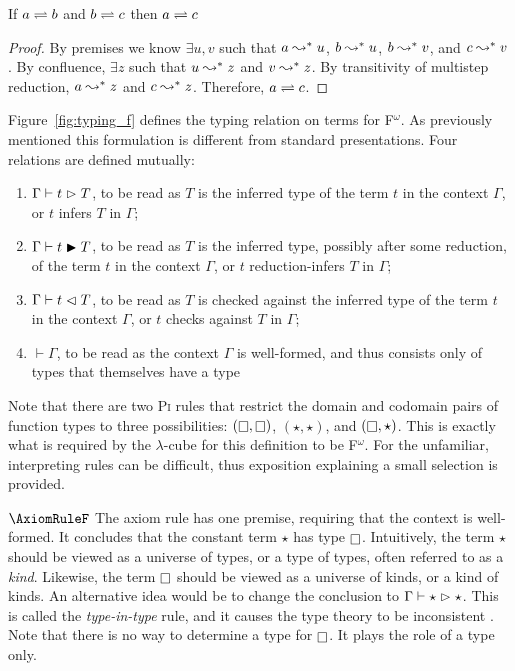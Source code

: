 \begin{theorem}
    \label{thm:1:trans}
    If $a \rightleftharpoons b$ and $b \rightleftharpoons c$ then $a \rightleftharpoons c$
\end{theorem}
\begin{proof}
    By premises we know $\exists u, v$ such that $a \leadsto^* u$, $b \leadsto^* u$, $b \leadsto^* v$, and $c \leadsto^* v$.
    By confluence, $\exists z$ such that $u \leadsto^* z$ and $v \leadsto^* z$.
    By transitivity of multistep reduction, $a \leadsto^* z$ and $c \leadsto^* z$.
    Therefore, $a \rightleftharpoons c$.
\end{proof}



Figure~\ref{fig:typing_f} defines the typing relation on terms for F$^\omega$.
As previously mentioned this formulation is different from standard presentations.
Four relations are defined mutually:
\begin{enumerate}
    \item $\Gamma \vdash t \vartriangleright T$, to be read as $T$ is the inferred type of the term $t$ in the context $\Gamma$, or $t$ infers $T$ in $\Gamma$;
    \item $\Gamma \vdash t \blacktriangleright T$, to be read as $T$ is the inferred type, possibly after some reduction, of the term $t$ in the context $\Gamma$, or $t$ reduction-infers $T$ in $\Gamma$;
    \item $\Gamma \vdash t \vartriangleleft T$, to be read as $T$ is checked against the inferred type of the term $t$ in the context $\Gamma$, or $t$ checks against $T$ in $\Gamma$;
    \item $\vdash \Gamma$, to be read as the context $\Gamma$ is well-formed, and thus consists only of types that themselves have a type
\end{enumerate}
Note that there are two \textsc{Pi} rules that restrict the domain and codomain pairs of function types to three possibilities: $(\kind, \kind)$, $(\star, \star)$, and $(\kind, \star)$.
This is exactly what is required by the $\lambda$-cube for this definition to be F$^\omega$.
For the unfamiliar, interpreting rules can be difficult, thus exposition explaining a small selection is provided.

$\AxiomRuleF$ The axiom rule has one premise, requiring that the context is well-formed.
It concludes that the constant term $\star$ has type $\kind$.
Intuitively, the term $\star$ should be viewed as a universe of types, or a type of types, often referred to as a \textit{kind}.
Likewise, the term $\kind$ should be viewed as a universe of kinds, or a kind of kinds.
An alternative idea would be to change the conclusion to $\Gamma \vdash \star \vartriangleright \star$.
This is called the \textit{type-in-type} rule, and it causes the type theory to be inconsistent \cite{girard1972,hurkens1995}.
Note that there is no way to determine a type for $\kind$.
It plays the role of a type only.

